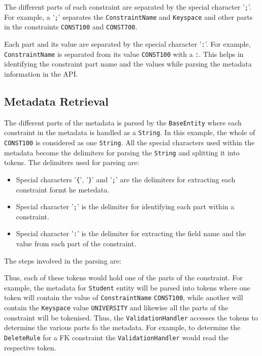 	The different parts of each constraint are separated by the special character
	'\texttt{;}'. For example, a '\texttt{;}' separates the \texttt{ConstraintName}
	 and \texttt{Keyspace} and other parts in the constraints \texttt{CONST100} and
	 \texttt{CONST700}.


	Each part and its value are separated by the special character
	'\texttt{:}'. For example, \texttt{ConstraintName} is separated from
	its value \texttt{CONST100} with a \texttt{:}. This helps in identifying the
	constraint part name  and the values while parsing the metadata information
	in the \ac{API}.
\subsection{Metadata Retrieval}
	The different parts of the metadata is parsed by the
	\texttt{BaseEntity} where each constraint in the metadata is handled as a
	\texttt{String}. In this example, the whole of \texttt{CONST100} is
	considered as one \texttt{String}. All the special characters used within the
	metadata become the delimiters for parsing the \texttt{String} and splitting it
	into tokens.
	The delimiters used for parsing are:
	\begin{itemize}
	  \item Special characters '\texttt{\{}', '\texttt{\}}' and '\texttt{;}' are
	  the delimiters for extracting each constraint formt he metedata.
	  \item Special character '\texttt{;}' is the delimiter for identifying each
	  part within a constraint.
	  \item Special character '\texttt{:}' is the delimiter for extracting the
	  field name and the value from each part of the constraint.
	\end{itemize}

	The steps involved in the parsing are:

	Thus, each of these tokens would hold one of the parts of the constraint. For
	example, the metadata for \texttt{Student} entity will be parsed into tokens
	where one token will contain the value of \texttt{ConstraintName}
	\texttt{CONST100}, while another will contain the \texttt{Keyspace} value
	\texttt{UNIVERSITY} and likewise all the parts of the constraint will be
	tokenised. Thus, the \texttt{ValidationHandler} accesses the tokens to determine
	the various parts fo the metadata. For example, to determine the
	\texttt{DeleteRule} for a \ac{FK} constraint the \texttt{ValidationHandler}
	would read the respective token.

